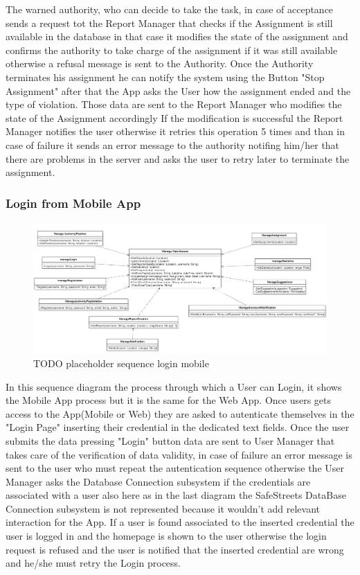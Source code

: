 The warned authority, who can decide to take the task, in case of acceptance sends a request tot the Report Manager that checks if the Assignment is still available in the database in that case it modifies the state of the assignment and confirms the authority to take charge of the assignment if it was still available otherwise a refusal message is sent to the Authority.
Once the Authority terminates his assignment he can notify the system using the Button "Stop Assignment" after that the App asks the User how the assignment ended and the type of violation. Those data are sent to the Report Manager who modifies the state of the Assignment accordingly If the modification is successful the Report Manager notifies the user otherwise it retries this operation 5 times and than in case of failure it sends an error message to the authority notifing him/her that there are problems in the server and asks the user to retry later to terminate the assignment.
\subsubsection{Login from Mobile App}
\begin{figure}[H]
\centering
\includegraphics[width=\textwidth]{Images/Interfaces.png}
\caption{\label{fig:ComWI}TODO placeholder sequence login mobile}
\end{figure}
In this sequence diagram the process through which a User can Login, it shows the Mobile App process but it is the same for the Web App.
Once users gets access to the App(Mobile or Web) they are asked to autenticate themselves in the "Login Page" inserting their credential in the dedicated text fields. Once the user submits the data pressing "Login" button data are sent to User Manager that takes care of the verification of data validity, in case of failure an error message is sent to the user who must repeat the autentication sequence otherwise the User Manager asks the Database Connection subsystem if the credentials are associated with a user also here as in the last diagram the SafeStreets DataBase Connection subsystem is not represented because it wouldn't add relevant interaction for the App. If a  user is found associated to the inserted credential the user is logged in and the homepage is shown to the user otherwise the login request is refused  and the user is notified that the inserted credential are wrong and he/she must retry the Login process.
